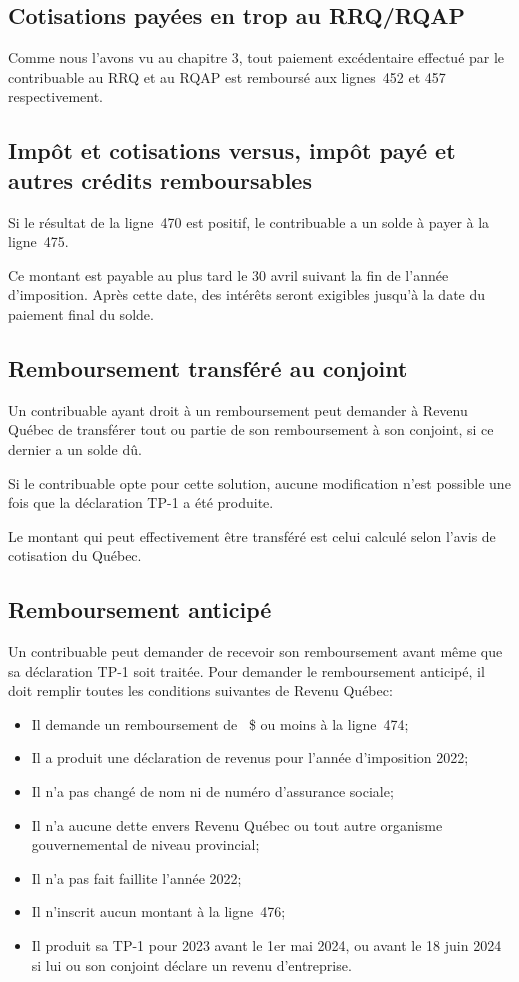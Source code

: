 \subsection{Cotisations payées en trop au RRQ/RQAP}
Comme nous l'avons vu au chapitre 3, tout paiement excédentaire effectué par le contribuable au RRQ et au RQAP est remboursé aux lignes~452 et 457 respectivement.

\subsection{Impôt et cotisations versus, impôt payé et autres crédits remboursables}
Si le résultat de la ligne~470 est positif, le contribuable a un solde à payer à la ligne~475.

Ce montant est payable au plus tard le 30 avril suivant la fin de l'année d'imposition. Après cette date, des intérêts seront exigibles jusqu'à la date du paiement final du solde.

\subsection{Remboursement transféré au conjoint}
Un contribuable ayant droit à un remboursement peut demander à Revenu Québec de transférer tout ou partie de son remboursement à son conjoint, si ce dernier a un solde dû.

Si le contribuable opte pour cette solution, aucune modification n'est possible une fois que la déclaration TP-1 a été produite.

Le montant qui peut effectivement être transféré est celui calculé selon l'avis de cotisation du Québec.

\subsection{Remboursement anticipé}
Un contribuable peut demander de recevoir son remboursement avant même que sa déclaration TP-1 soit traitée. Pour demander le remboursement anticipé, il doit remplir toutes les conditions suivantes de Revenu Québec:
\begin{itemize}
	\item Il demande un remboursement de ~\$ ou moins à la ligne~474;
	\item Il a produit une déclaration de revenus pour l'année d'imposition 2022;
	\item Il n'a pas changé de nom ni de numéro d'assurance sociale;
	\item Il n'a aucune dette envers Revenu Québec ou tout autre organisme gouvernemental de niveau provincial;
	\item Il n'a pas fait faillite l'année 2022;
	\item Il n'inscrit aucun montant à la ligne~476;
	\item Il produit sa TP-1 pour 2023 avant le 1er mai 2024, ou avant le 18 juin 2024 si lui ou son conjoint déclare un revenu d'entreprise.
\end{itemize}

